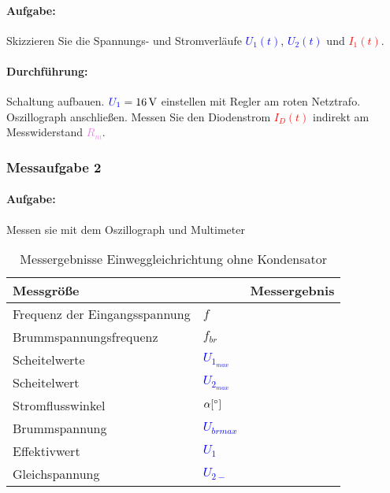 \documentclass[11pt,a4paper,titlepage]{scrreprt}
\newcommand{\spannung}[1]{\textcolor{blue}{#1}}
\newcommand{\strom}[1]{\textcolor{red}{#1}}
\newcommand{\widerstand}[1]{\textcolor{violet}{#1}}
\begin{document}
				\paragraph{Aufgabe:} Skizzieren Sie die Spannungs- und Stromverläufe \spannung{$U_1(t)$}, \spannung{$U_2(t)$} und \strom{$I_1(t)$}.
				\paragraph{Durchführung:} Schaltung aufbauen. $\spannung{U_1} = \SI{16}{\volt}$ einstellen mit Regler am roten Netztrafo. Oszillograph anschließen. Messen Sie den Diodenstrom \strom{$I_D(t)$} indirekt am Messwiderstand \widerstand{$R_m$}.

				
						
			\subsubsection{Messaufgabe 2}
				\paragraph{Aufgabe:} Messen sie mit dem Oszillograph und Multimeter
					\begin{table}[!hbtp]
						\caption{Messergebnisse Einweggleichrichtung ohne Kondensator}
						\label{tbl:messergebnisse1.1}
						\renewcommand{\arraystretch}{1.3}
						\begin{tabular}{ll|l}
							\multicolumn{2}{l}{\textbf{Messgröße}} & \textbf{Messergebnis}\\ \hline
							Frequenz der Eingangsspannung & $f$ & \\%
							Brummspannungsfrequenz & $f_{br}$ &\\%
							Scheitelwerte & \spannung{$U_{1_{max}}$} &\\%
							Scheitelwert & \spannung{$U_{2_{max}}$} &\\%
							Stromflusswinkel &  $\alpha [ \degree]$& \\%
							Brummspannung &  \spannung{$U_{brmax}$} &\\%
							Effektivwert & \spannung{$U_{1}$} &\\%
							Gleichspannung & \spannung{$U_{2-}$} & \\%
						\end{tabular}
					\end{table}
\end{document}
